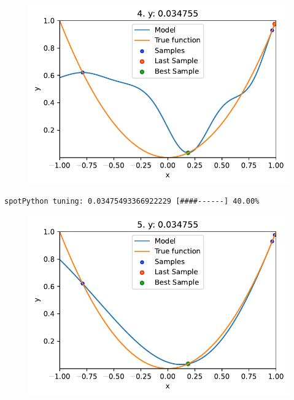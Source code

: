 \documentclass[
  letterpaper,
  DIV=11,
  numbers=noendperiod]{scrreprt}
\begin{document}
\begin{figure}[H]

{\centering \includegraphics{010_num_spot_sklearn_surrogate_files/figure-pdf/cell-21-output-2.pdf}

}

\end{figure}

\begin{verbatim}
spotPython tuning: 0.03475493366922229 [####------] 40.00% 
\end{verbatim}

\begin{figure}[H]

{\centering \includegraphics{010_num_spot_sklearn_surrogate_files/figure-pdf/cell-21-output-4.pdf}

}

\end{figure}
\end{document}
